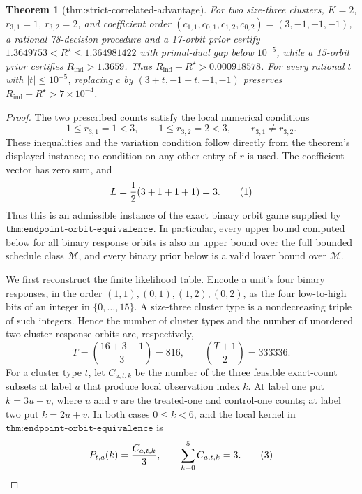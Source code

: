 \documentclass{article}
\newtheorem{theorem}{Theorem}
\begin{document}
\begin{theorem}[thm:strict-correlated-advantage]\label{thm:strict-correlated-advantage}
For two size-three clusters, \(K=2\), \(r_{3,1}=1\), \(r_{3,2}=2\), and coefficient order \((c_{1,1},c_{0,1},c_{1,2},c_{0,2})=(3,-1,-1,-1)\), a rational 78-decision procedure and a 17-orbit prior certify \(1.3649753<R^\star\le1.364981422\) with primal-dual gap below \(10^{-5}\), while a 15-orbit prior certifies \(R_{\mathrm{ind}}>1.3659\). Thus \(R_{\mathrm{ind}}-R^\star>0.000918578\). For every rational \(t\) with \(|t|\le10^{-5}\), replacing \(c\) by \((3+t,-1-t,-1,-1)\) preserves \(R_{\mathrm{ind}}-R^\star>7\times10^{-4}\).
\end{theorem}
\begin{proof}
The two prescribed counts satisfy the local numerical conditions
\[
1\le r_{3,1}=1<3,
\qquad
1\le r_{3,2}=2<3,
\qquad
r_{3,1}\ne r_{3,2}.
\]
These inequalities and the variation condition follow directly from the theorem's displayed instance; no condition on any other entry of \(r\) is used.  The coefficient vector has zero sum, and
\[
L={1\over2}(3+1+1+1)=3.                                                    \tag{1}
\]
Thus this is an admissible instance of the exact binary orbit game supplied by \(\texttt{thm:endpoint-orbit-equivalence}\).  In particular, every upper bound computed below for all binary response orbits is also an upper bound over the full bounded schedule class \(\mathcal M\), and every binary prior below is a valid lower bound over \(\mathcal M\).

We first reconstruct the finite likelihood table.  Encode a unit's four binary responses, in the order \((1,1),(0,1),(1,2),(0,2)\), as the four low-to-high bits of an integer in \(\{0,\ldots,15\}\).  A size-three cluster type is a nondecreasing triple of such integers.  Hence the number of cluster types and the number of unordered two-cluster response orbits are, respectively,
\[
T=\binom{16+3-1}{3}=816,
\qquad
\binom{T+1}{2}=333336.                                                       \tag{2}
\]
For a cluster type \(t\), let \(C_{a,t,k}\) be the number of the three feasible exact-count subsets at label \(a\) that produce local observation index \(k\).  At label one put \(k=3u+v\), where \(u\) and \(v\) are the treated-one and control-one counts; at label two put \(k=2u+v\).  In both cases \(0\le k<6\), and the local kernel in \(\texttt{thm:endpoint-orbit-equivalence}\) is
\[
P_{t,a}(k)={C_{a,t,k}\over3},
\qquad
\sum_{k=0}^{5}C_{a,t,k}=3.                                                  \tag{3}
\]


\end{proof}
\end{document}
